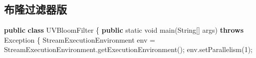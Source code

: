 \documentclass[cn,11pt,chinese]{elegantbook}
\newenvironment{Shaded}{}{}
\newcommand{\BuiltInTok}[1]{#1}
\newcommand{\DataTypeTok}[1]{\textcolor[rgb]{0.56,0.13,0.00}{#1}}
\newcommand{\DecValTok}[1]{\textcolor[rgb]{0.25,0.63,0.44}{#1}}
\newcommand{\FunctionTok}[1]{\textcolor[rgb]{0.02,0.16,0.49}{#1}}
\newcommand{\KeywordTok}[1]{\textcolor[rgb]{0.00,0.44,0.13}{\textbf{#1}}}
\newcommand{\NormalTok}[1]{#1}
\begin{document}
\hypertarget{ux5e03ux9686ux8fc7ux6ee4ux5668ux7248}{%
\subsection{布隆过滤器版}\label{ux5e03ux9686ux8fc7ux6ee4ux5668ux7248}}

\begin{Shaded}
\begin{Highlighting}[]
\KeywordTok{public} \KeywordTok{class}\NormalTok{ UVBloomFilter \{}
    \KeywordTok{public} \DataTypeTok{static} \DataTypeTok{void} \FunctionTok{main}\NormalTok{(}\BuiltInTok{String}\NormalTok{[] args) }\KeywordTok{throws} \BuiltInTok{Exception}\NormalTok{ \{}
\NormalTok{        StreamExecutionEnvironment env = StreamExecutionEnvironment.}\FunctionTok{getExecutionEnvironment}\NormalTok{();}
\NormalTok{        env.}\FunctionTok{setParallelism}\NormalTok{(}\DecValTok{1}\NormalTok{);}


\end{Highlighting}
\end{Shaded}
\end{document}
